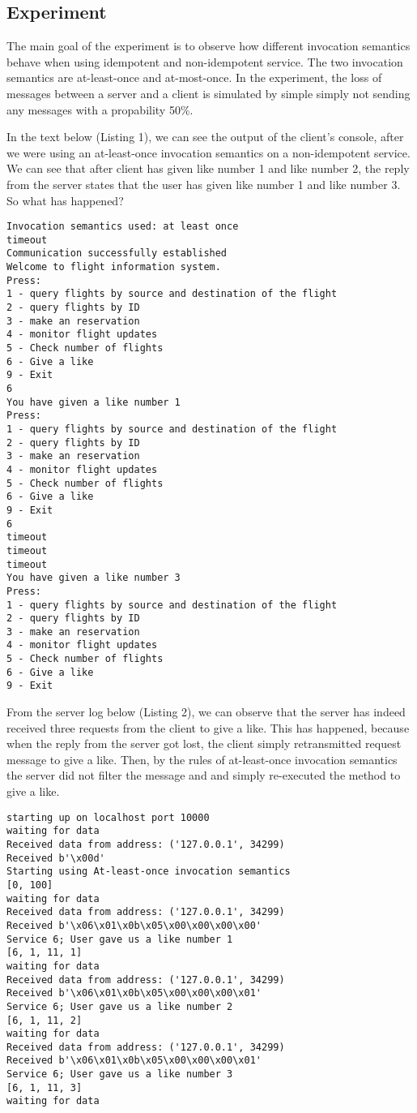 \documentclass[12pt,a4paper]{article}
\begin{document}
\subsection{Experiment}
The main goal of the experiment is to observe how different invocation semantics behave when using idempotent and non-idempotent service. The two invocation semantics are at-least-once and at-most-once. In the experiment, the loss of messages between a server and a client is simulated by simple simply not sending any messages with a propability 50\%. \par \medskip In the text below (Listing 1), we can see the output of the client's console, after we were using an at-least-once invocation semantics on a non-idempotent service. We can see that after client has given like number 1 and like number 2, the reply from the server states that the user has given like number 1 and like number 3. So what has happened?
\begin{lstlisting}[caption={Client console output},xleftmargin=.03\textwidth]
Invocation semantics used: at least once
timeout
Communication successfully established
Welcome to flight information system.
Press:
1 - query flights by source and destination of the flight
2 - query flights by ID
3 - make an reservation
4 - monitor flight updates
5 - Check number of flights
6 - Give a like
9 - Exit
6
You have given a like number 1
Press:
1 - query flights by source and destination of the flight
2 - query flights by ID
3 - make an reservation
4 - monitor flight updates
5 - Check number of flights
6 - Give a like
9 - Exit
6
timeout
timeout
timeout
You have given a like number 3
Press:
1 - query flights by source and destination of the flight
2 - query flights by ID
3 - make an reservation
4 - monitor flight updates
5 - Check number of flights
6 - Give a like
9 - Exit
\end{lstlisting}

From the server log below (Listing 2), we can observe that the server has indeed received three requests from the client to give a like. This has happened, because when the reply from the server got lost, the client simply retransmitted request message to give a like. Then, by the rules of at-least-once invocation semantics the server did not filter the message and and simply re-executed the method to give a like.
\begin{lstlisting}[caption={Server console output},xleftmargin=.03\textwidth]
starting up on localhost port 10000
waiting for data
Received data from address: ('127.0.0.1', 34299)
Received b'\x00d'
Starting using At-least-once invocation semantics
[0, 100]
waiting for data
Received data from address: ('127.0.0.1', 34299)
Received b'\x06\x01\x0b\x05\x00\x00\x00\x00'
Service 6; User gave us a like number 1
[6, 1, 11, 1]
waiting for data
Received data from address: ('127.0.0.1', 34299)
Received b'\x06\x01\x0b\x05\x00\x00\x00\x01'
Service 6; User gave us a like number 2
[6, 1, 11, 2]
waiting for data
Received data from address: ('127.0.0.1', 34299)
Received b'\x06\x01\x0b\x05\x00\x00\x00\x01'
Service 6; User gave us a like number 3
[6, 1, 11, 3]
waiting for data
\end{lstlisting}
\end{document}
